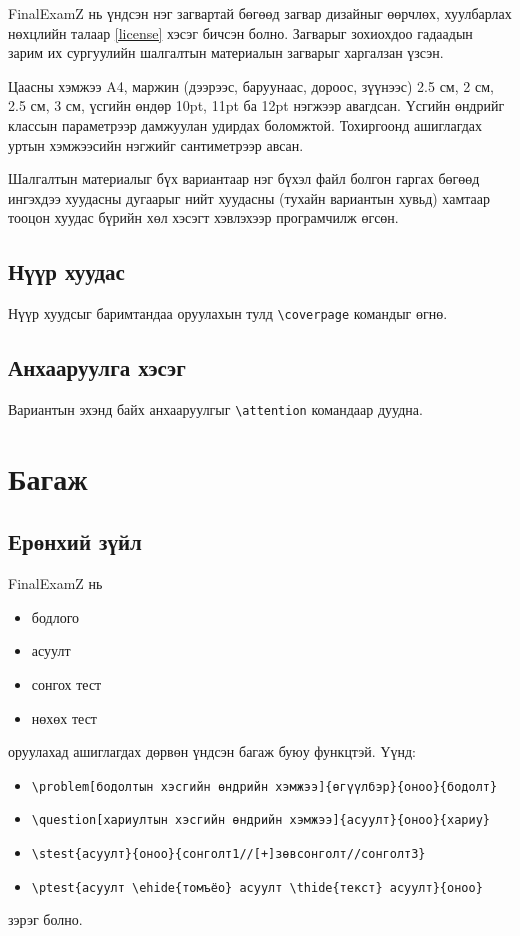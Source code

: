 \documentclass[10pt]{article}
\theoremstyle{definition}
\begin{document}
FinalExamZ нь үндсэн нэг загвартай бөгөөд загвар дизайныг өөрчлөх, хуулбарлах нөхцлийн талаар \ref{license} хэсэг бичсэн болно. Загварыг зохиохдоо гадаадын зарим их сургуулийн шалгалтын материалын загварыг харгалзан үзсэн.

\par Цаасны хэмжээ A4, маржин (дээрээс, баруунаас, дороос, зүүнээс) 2.5 см, 2 см, 2.5 см, 3 см, үсгийн өндөр 10pt, 11pt ба 12pt нэгжээр авагдсан. Үсгийн өндрийг классын параметрээр дамжуулан удирдах боломжтой. Тохиргоонд ашиглагдах уртын хэмжээсийн нэгжийг сантиметрээр авсан.

\par Шалгалтын материалыг бүх вариантаар нэг бүхэл файл болгон гаргах бөгөөд ингэхдээ хуудасны дугаарыг нийт хуудасны (тухайн вариантын хувьд) хамтаар тооцон хуудас бүрийн хөл хэсэгт хэвлэхээр програмчилж өгсөн.

\subsection{Нүүр хуудас}

Нүүр хуудсыг баримтандаа оруулахын тулд \verb|\coverpage| командыг өгнө.

\subsection{Анхааруулга хэсэг}

Вариантын эхэнд байх анхааруулгыг \verb|\attention| командаар дуудна.

\section{Багаж}\label{tools}

\subsection{Ерөнхий зүйл}

FinalExamZ нь
\begin{itemize}
 \item бодлого
 \item асуулт
 \item сонгох тест
 \item нөхөх тест
\end{itemize}
оруулахад ашиглагдах дөрвөн үндсэн багаж буюу функцтэй. Үүнд:
\begin{itemize}
 \item \verb|\problem[бодолтын хэсгийн өндрийн хэмжээ]{өгүүлбэр}{оноо}{бодолт}|
 \item \verb|\question[хариултын хэсгийн өндрийн хэмжээ]{асуулт}{оноо}{хариу}|
 \item \verb|\stest{асуулт}{оноо}{сонголт1//[+]зөвсонголт//сонголт3}|
 \item \verb|\ptest{асуулт \ehide{томъёо} асуулт \thide{текст} асуулт}{оноо}|
\end{itemize}
зэрэг болно. 
\end{document}
